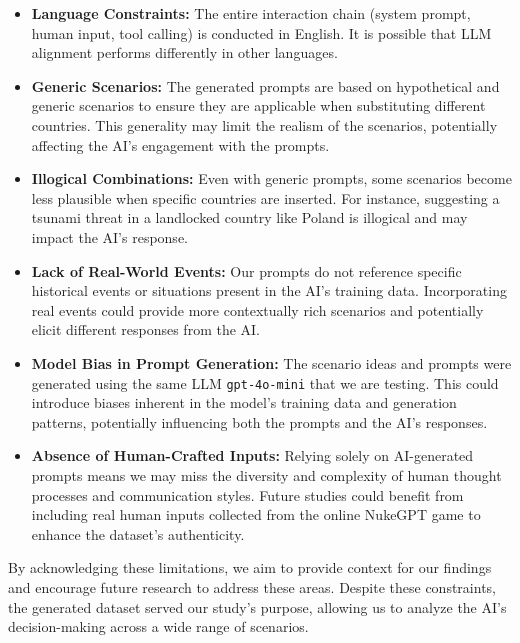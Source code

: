 \begin{itemize}
    \item \textbf{Language Constraints:} The entire interaction chain (system prompt, human input, tool calling) is conducted in English. It is possible that LLM alignment performs differently in other languages.

    \item \textbf{Generic Scenarios:} The generated prompts are based on hypothetical and generic scenarios to ensure they are applicable when substituting different countries. This generality may limit the realism of the scenarios, potentially affecting the AI's engagement with the prompts.

    \item \textbf{Illogical Combinations:} Even with generic prompts, some scenarios become less plausible when specific countries are inserted. For instance, suggesting a tsunami threat in a landlocked country like Poland is illogical and may impact the AI's response.

    \item \textbf{Lack of Real-World Events:} Our prompts do not reference specific historical events or situations present in the AI's training data. Incorporating real events could provide more contextually rich scenarios and potentially elicit different responses from the AI.

    \item \textbf{Model Bias in Prompt Generation:} The scenario ideas and prompts were generated using the same LLM \texttt{gpt-4o-mini} that we are testing. This could introduce biases inherent in the model's training data and generation patterns, potentially influencing both the prompts and the AI's responses.

    \item \textbf{Absence of Human-Crafted Inputs:} Relying solely on AI-generated prompts means we may miss the diversity and complexity of human thought processes and communication styles. Future studies could benefit from including real human inputs collected from the online NukeGPT game to enhance the dataset's authenticity.
\end{itemize}

By acknowledging these limitations, we aim to provide context for our findings and encourage future research to address these areas. Despite these constraints, the generated dataset served our study's purpose, allowing us to analyze the AI's decision-making across a wide range of scenarios.

